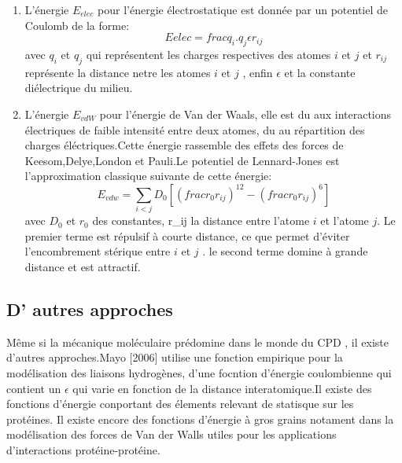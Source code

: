 \begin{enumerate}
  \label{VdW}
\item L'énergie $E_{elec}$ pour l'énergie électrostatique est donnée par un potentiel de Coulomb de la forme:
  \begin{equation}
    E{elec}= frac{q_i.q_j}{\epsilon r_{ij}}
  \end{equation}
  avec $q_i$ et $q_j$ qui représentent les charges respectives des atomes $i$ et $j$ et $r_{ij}$ représente la distance netre les atomes $i$ et $j$ , enfin $\epsilon$ et la constante diélectrique du milieu.
\item L'énergie  $E_{vdW}$ pour l'énergie de Van der Waals, elle est du aux interactions électriques de faible intensité entre deux atomes, du au répartition des charges éléctriques.Cette énergie rassemble des effets des forces de Keesom,Delye,London et Pauli.Le potentiel de Lennard-Jones est l'approximation classique suivante de cette énergie:
  \begin{equation}
  E_{vdw} = \sum_{i<j}D_0 [(frac{r_0}{r_{ij}})^12 - (frac{r_0}{r_{ij}})^6]  
  \end{equation}
avec $D_0$ et $r_0$ des constantes, r_{ij} la distance entre l'atome $i$ et l'atome $j$. Le premier terme est répulsif à courte distance, ce que permet d'éviter l'encombrement stérique entre $i$ et $j$ . le second terme domine à grande distance et est attractif. 
  
\end{enumerate}


\subsection{D' autres approches}

Même si la mécanique moléculaire prédomine dans le monde du CPD , il existe d'autres approches.Mayo [2006] utilise une fonction empirique pour la modélisation des liaisons hydrogènes, d'une focntion d'énergie coulombienne qui contient un $\epsilon$ qui varie en fonction de la distance interatomique.Il existe des fonctions d'énergie  conportant des élements relevant de statisque sur les protéines. Il existe encore des fonctions d'énergie à gros grains notament dans la modélisation des forces de Van der Walls utiles pour les applications d'interactions protéine-protéine.


